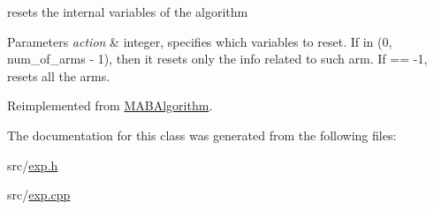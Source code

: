 resets the internal variables of the algorithm 


\begin{DoxyParams}{Parameters}
{\em action} & integer, specifies which variables to reset. If in (0, num\+\_\+of\+\_\+arms -\/ 1), then it resets only the info related to such arm. If == -\/1, resets all the arms. \\
\hline
\end{DoxyParams}


Reimplemented from \mbox{\hyperlink{class_m_a_b_algorithm_ad5761cee0b0e3421d1f043dbcc0b5f85}{M\+A\+B\+Algorithm}}.



The documentation for this class was generated from the following files\+:\begin{DoxyCompactItemize}
\item 
src/\mbox{\hyperlink{exp_8h}{exp.\+h}}\item 
src/\mbox{\hyperlink{exp_8cpp}{exp.\+cpp}}\end{DoxyCompactItemize}
